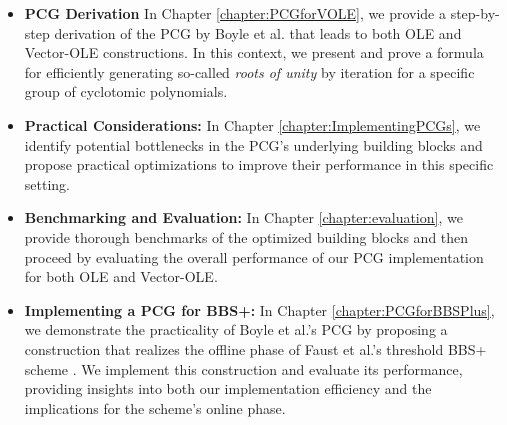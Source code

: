 \begin{itemize}
\item \textbf{PCG Derivation} In Chapter \ref{chapter:PCGforVOLE}, we provide a step-by-step derivation of the PCG by Boyle et al. that leads to both OLE and Vector-OLE constructions. In this context, we present and prove a formula for efficiently generating so-called \textit{roots of unity} by iteration for a specific group of cyclotomic polynomials.
\item \textbf{Practical Considerations:} In Chapter \ref{chapter:ImplementingPCGs}, we identify potential bottlenecks in the PCG's underlying building blocks and propose practical optimizations to improve their performance in this specific setting.
\item \textbf{Benchmarking and Evaluation:} In Chapter \ref{chapter:evaluation}, we provide thorough benchmarks of the optimized building blocks and then proceed by evaluating the overall performance of our PCG implementation for both OLE and Vector-OLE.
\item \textbf{Implementing a PCG for BBS+:} In Chapter \ref{chapter:PCGforBBSPlus}, we demonstrate the practicality of Boyle et al.'s PCG by proposing a construction that realizes the offline phase of Faust et al.'s threshold BBS+ scheme \cite{faust2023non}. We implement this construction and evaluate its performance, providing insights into both our implementation efficiency and the implications for the scheme's online phase.
\end{itemize}

